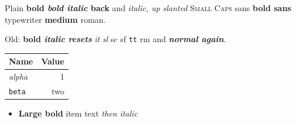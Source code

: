 \documentclass{article}
\begin{document}
Plain {\bfseries bold {\itshape bold italic} back} and {\itshape italic, {\upshape up}}
{\slshape slanted} {\scshape Small Caps} {\sffamily sans {\bfseries bold sans}}
{\ttfamily typewriter} {\bfseries\mdseries medium} {\rmfamily roman}.

Old: {\bf bold {\it italic resets}} {\it it} {\sl sl} {\sc sc} {\sf sf} {\tt tt} {\rm rm}
and {\bfseries\itshape\normalfont normal again}.

\begin{tabular}{l|r}
\bfseries Name & \bfseries Value \\ \hline
{\it alpha} & 1 \\
\tt beta & {\sc two}
\end{tabular}

\begin{itemize}\item {\large\bfseries Large bold} item text \itshape then italic\end{itemize}
\end{document}
